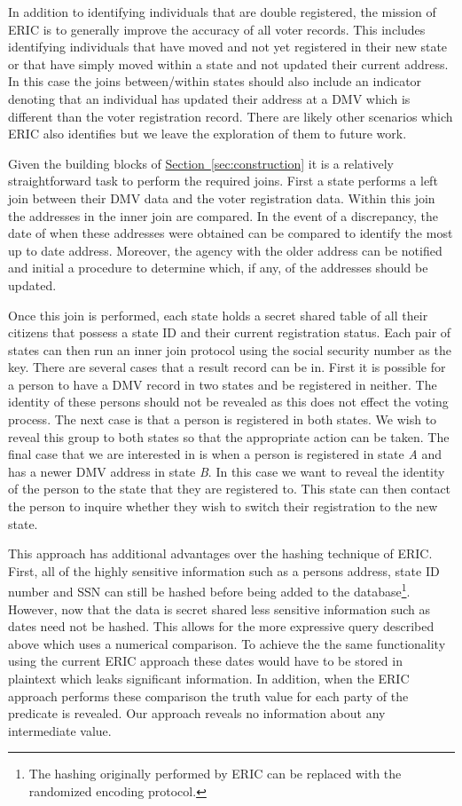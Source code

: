 \documentclass[11pt,letterpaper]{article}
\newcommand{\namedref}[2]{\hyperref[#2]{#1~\ref*{#2}}}
\newcommand{\sectionref}[1]{\namedref{Section}{#1}}
\begin{document}
In addition to identifying individuals that are double registered, the mission of ERIC is to generally improve the accuracy of all voter records. This includes identifying individuals that have moved and not yet registered in their new state or that have simply moved within a state and not updated their current address. In this case the joins between/within states should also include an indicator denoting that an individual has updated their address at a DMV which is different than the voter registration record. There are likely other scenarios which ERIC also identifies but we leave the exploration of them to future work.

Given the building blocks of \sectionref{sec:construction} it is a relatively straightforward task to perform the required joins. First a state performs a left join between their DMV data and the voter registration data. Within this join the addresses in the inner join are compared. In the event of a discrepancy, the date of when these addresses were obtained can be compared to identify the most up to date address. Moreover, the agency with the older address can be notified and initial a procedure to determine which, if any, of the addresses should be updated. 


Once this join is performed, each state holds a secret shared table of all their citizens that possess a state ID and their current registration status. Each pair of states can then run an inner join protocol using the social security number as the key. There are several cases that a result record can be in. First it is possible for a person to have a DMV record in two states and be registered in neither. The identity of these persons should not be revealed as this does not effect the voting process. The next case is that a person is registered in both states. We wish to reveal this group to both states so that the appropriate action can be taken. The final case that we are interested in is when a person is registered in state \emph{A} and has a newer DMV address in state \emph{B}. In this case we want to reveal the identity of the person to the state that they are registered to. This state can then contact the person to inquire whether they wish to switch their registration to the new state. 


This approach has additional advantages over the hashing technique of ERIC. First, all of the highly sensitive information such as a persons address, state ID number and SSN can still be hashed before being added to the database\footnote{The hashing originally performed by ERIC can be replaced with the randomized encoding protocol.}. However, now that the data is secret shared less sensitive information such as dates need not be hashed. This allows for the more expressive query described above which uses a numerical comparison. To achieve the the same functionality using the current ERIC approach these dates would have to be stored in plaintext which leaks significant information. In addition, when the ERIC approach performs these comparison the truth value for each party of the predicate is revealed. Our approach reveals no information about any intermediate value. 
\end{document}
